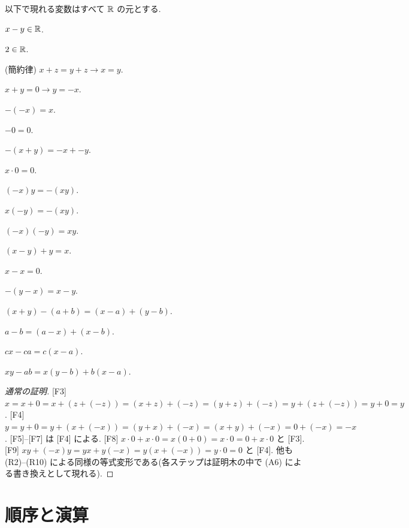 \begin{lem}\label{lem:field}
  以下で現れる変数はすべて $\mathbb{R}$ の元とする.
  \begin{enumerate}[label={[F\arabic*]}]
    \item $x - y \in \mathbb{R}$.
    \item $2 \in \mathbb{R}$.
    \item (簡約律) $x + z = y + z \to x = y$.
    \item $x + y = 0 \to y = -x$.
    \item $-(-x) = x$.
    \item $-0 = 0$.
    \item $-(x + y) = -x + -y$.
    \item $x \cdot 0 = 0$.
    \item $(-x) y = -(x y)$.
    \item $x (-y) = -(x y)$.
    \item $(-x)(-y) = x y$.
    \item $(x - y) + y = x$.
    \item $x - x = 0$.
    \item $-(y - x) = x - y$.
    \item $(x + y) - (a + b) = (x - a) + (y - b)$.
    \item $a - b = (a - x) + (x - b)$.
    \item $c x - c a = c (x - a)$.
    \item $x y - a b = x (y - b) + b (x - a)$.
  \end{enumerate}
\end{lem}
\begin{proof}[通常の証明]
  [F3] $x = x + 0 = x + (z + (-z)) = (x + z) + (-z) = (y + z) + (-z) = y + (z + (-z)) = y + 0 = y$. [F4] $y = y + 0 = y + (x + (-x)) = (y + x) + (-x) = (x + y) + (-x) = 0 + (-x) = -x$. [F5]--[F7] は [F4] による. [F8] $x \cdot 0 + x \cdot 0 = x(0 + 0) = x \cdot 0 = 0 + x \cdot 0$ と [F3]. [F9] $x y + (-x) y = y x + y(-x) = y(x + (-x)) = y \cdot 0 = 0$ と [F4]. 他も (R2)--(R10) による同様の等式変形である(各ステップは証明木の中で (A6) による書き換えとして現れる).
\end{proof}

\section{順序と演算}

